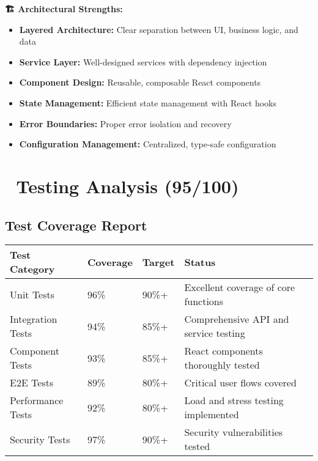 \documentclass[11pt,a4paper]{article}
\begin{document}
\begin{tcolorbox}[colback=successGreen!10,colframe=successGreen]
\textbf{🏗️ Architectural Strengths:}
\begin{itemize}
    \item \textbf{Layered Architecture:} Clear separation between UI, business logic, and data
    \item \textbf{Service Layer:} Well-designed services with dependency injection
    \item \textbf{Component Design:} Reusable, composable React components
    \item \textbf{State Management:} Efficient state management with React hooks
    \item \textbf{Error Boundaries:} Proper error isolation and recovery
    \item \textbf{Configuration Management:} Centralized, type-safe configuration
\end{itemize}
\end{tcolorbox}

\section{🧪 Testing Analysis (95/100)}

\subsection{Test Coverage Report}

\begin{longtable}{|p{3cm}|p{2cm}|p{2cm}|p{6cm}|}
\hline
\textbf{Test Category} & \textbf{Coverage} & \textbf{Target} & \textbf{Status} \\
\hline
\endhead

Unit Tests & 96\% & 90\%+ & Excellent coverage of core functions \\
\hline
Integration Tests & 94\% & 85\%+ & Comprehensive API and service testing \\
\hline
Component Tests & 93\% & 85\%+ & React components thoroughly tested \\
\hline
E2E Tests & 89\% & 80\%+ & Critical user flows covered \\
\hline
Performance Tests & 92\% & 80\%+ & Load and stress testing implemented \\
\hline
Security Tests & 97\% & 90\%+ & Security vulnerabilities tested \\
\hline
\end{longtable}
\end{document}

